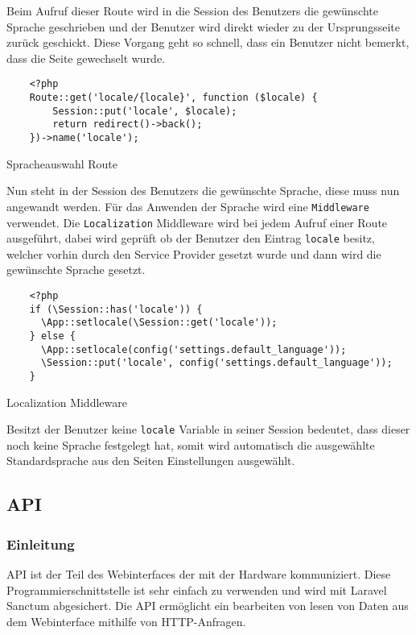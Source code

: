 Beim Aufruf dieser Route wird in die Session des Benutzers die gewünschte
Sprache geschrieben und der Benutzer wird direkt wieder zu der Ursprungsseite
zurück geschickt. Diese Vorgang geht so schnell, dass ein Benutzer nicht
bemerkt, dass die Seite gewechselt wurde.

\begin{listing}[H]
  \begin{verbatim}
    <?php
    Route::get('locale/{locale}', function ($locale) {
        Session::put('locale', $locale);
        return redirect()->back();
    })->name('locale');
  \end{verbatim}
  \caption{Spracheauswahl Route}
\end{listing}

Nun steht in der Session des Benutzers die gewünschte Sprache, diese muss nun
angewandt werden. Für das Anwenden der Sprache wird eine \verb|Middleware|
verwendet. Die \verb|Localization| Middleware wird bei jedem Aufruf einer Route
ausgeführt, dabei wird geprüft ob der Benutzer den Eintrag \verb|locale|
besitz, welcher vorhin durch den Service Provider gesetzt wurde und dann wird
die gewünschte Sprache gesetzt.

\begin{listing}[H]
  \begin{verbatim}
    <?php
    if (\Session::has('locale')) {
      \App::setlocale(\Session::get('locale'));
    } else {
      \App::setlocale(config('settings.default_language'));
      \Session::put('locale', config('settings.default_language'));
    }
  \end{verbatim}
  \caption{Localization Middleware}
\end{listing}

Besitzt der Benutzer keine \verb|locale| Variable in seiner Session bedeutet,
dass dieser noch keine Sprache festgelegt hat, somit wird automatisch die
ausgewählte Standardsprache aus den Seiten Einstellungen ausgewählt.

\subsection{API}
\subsubsection{Einleitung}
\ac*{API} ist der Teil des Webinterfaces der mit der Hardware kommuniziert.
Diese Programmierschnittstelle ist sehr einfach zu verwenden und wird mit
Laravel Sanctum abgesichert. Die API ermöglicht ein bearbeiten von lesen von
Daten aus dem Webinterface mithilfe von HTTP-Anfragen.

